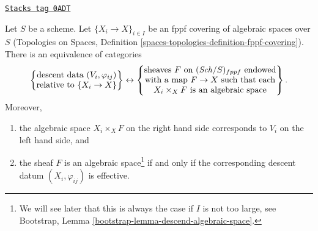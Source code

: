 \begin{lemma}
\label{spaces-descent-lemma-descent-data-sheaves}
\href{https://stacks.math.columbia.edu/tag/0ADT}{\texttt{Stacks tag 0ADT}}

Let $S$ be a scheme. Let $\{X_i \to X\}_{i \in I}$ be an fppf
covering of algebraic spaces over $S$ (Topologies on Spaces,
Definition \ref{spaces-topologies-definition-fppf-covering}).
There is an equivalence of categories
$$
\left\{
\begin{matrix}
\text{descent data }(V_i, \varphi_{ij})\\
\text{relative to }\{X_i \to X\}
\end{matrix}
\right\}
\leftrightarrow
\left\{
\begin{matrix}
\text{sheaves }F\text{ on }(\mathit{Sch}/S)_{fppf}\text{ endowed}\\
\text{with a map }F \to X\text{ such that each}\\
X_i \times_X F\text{ is an algebraic space}
\end{matrix}
\right\}.
$$
Moreover,
\begin{enumerate}
\item the algebraic space $X_i \times_X F$ on the right hand side
corresponds to $V_i$ on the left hand side, and
\item the sheaf $F$ is an algebraic space\footnote{We will see
later that this is always the case if $I$ is not too large, see
Bootstrap, Lemma \ref{bootstrap-lemma-descend-algebraic-space}.}
if and only if the
corresponding descent datum $(X_i, \varphi_{ij})$ is effective.
\end{enumerate}
\end{lemma}

